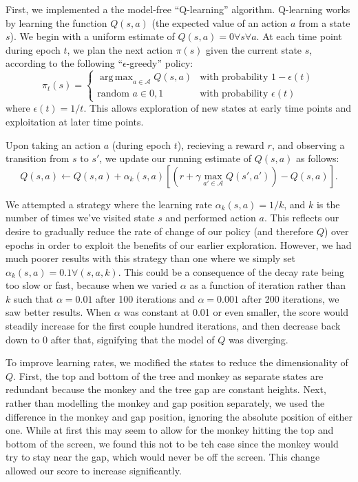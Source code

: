 \documentclass[11pt]{amsart}
\DeclareMathOperator*{\argmax}{arg\,max}
\begin{document}
First, we implemented a the model-free ``Q-learning'' algorithm. Q-learning works
by learning the function $Q(s,a)$ (the expected value of an action $a$ from a 
state $s$). We begin with a uniform estimate of $Q(s,a) = 0 \forall s \forall a$.
At each time point during epoch $t$, we plan the next action $\pi(s)$ given the 
current state $s$, according to the following ``$\epsilon$-greedy'' policy:
$$\pi_t(s) = \begin{cases} 
\argmax_{a \in \mathcal{A}} Q(s,a) & \text{with probability } 1-\epsilon(t) \\
\text{random } a \in {0,1}         & \text{with probability } \epsilon(t) 
\end{cases}$$
where $\epsilon(t) = 1/t$. This allows exploration of new states at early time 
points and exploitation at later time points.

Upon taking an action $a$ (during epoch $t$), recieving a reward $r$, and observing a transition from $s$
to $s'$, we update our running estimate of $Q(s,a)$ as follows:
$$Q(s,a) \gets Q(s,a) + \alpha_k(s,a) \left[ (r + \gamma \max_{a' \in \mathcal{A}} Q(s', a')) - Q(s,a) \right].$$

We attempted a strategy where the learning rate $\alpha_k(s,a) = 1/k$, and $k$ is the number of times we've visited state $s$ and performed action $a$. This reflects our desire to gradually reduce the rate of change of our policy (and therefore $Q$) over epochs in order to exploit the benefits of our earlier exploration. However, we had much poorer results with this strategy than one where we simply set $\alpha_k(s,a) = 0.1 \forall(s,a,k)$. This could be a consequence of the decay rate being too slow or fast, because when we varied $\alpha$ as a function of iteration rather than $k$ such that $\alpha=0.01$ after 100 iterations and $\alpha=0.001$ after 200 iterations, we saw better results. When $\alpha$ was constant at 0.01 or even smaller, the score would steadily increase for the first couple hundred iterations, and then decrease back down to 0 after that, signifying that the model of $Q$ was diverging.

To improve learning rates, we modified the states to reduce the dimensionality of $Q$. First, the top and bottom of the tree and monkey as separate states are redundant because the monkey and the tree gap are constant heights. Next, rather than modelling the monkey and gap position separately, we used the difference in the monkey and gap position, ignoring the absolute position of either one. While at first this may seem to allow for the monkey hitting the top and bottom of the screen, we found this not to be teh case since the monkey would try to stay near the gap, which would never be off the screen. This change allowed our score to increase significantly.
\end{document}
